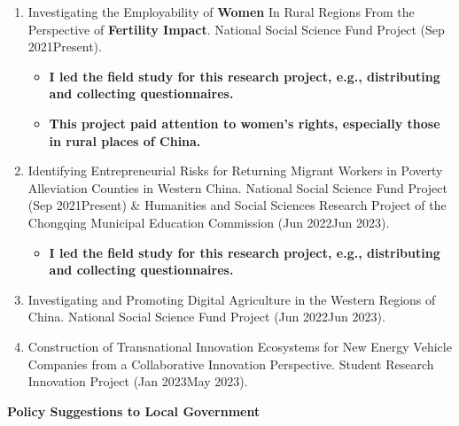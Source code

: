 \documentclass[a4paper,20pt]{article}
\begin{document}
    \begin{enumerate}
        \item Investigating the Employability of \textbf{Women} In Rural Regions From the Perspective of \textbf{Fertility Impact}.
        National Social Science Fund Project (Sep 2021\textemdash Present). 

            \begin{itemize}
     \vspace{-5pt}
	\item{\textbf{I led the field study for this research project, e.g., distributing and collecting questionnaires.}}
     \vspace{-5pt}
        \item{\textbf{This project paid attention to women's rights, especially those in rural places of China.}}
    \vspace{-5pt}
    \end{itemize}
        
        
        \item Identifying Entrepreneurial Risks for Returning Migrant Workers in Poverty Alleviation Counties in Western China.
        National Social Science Fund Project (Sep 2021\textemdash Present) \&  Humanities and Social Sciences Research Project of the Chongqing Municipal Education Commission (Jun 2022\textemdash Jun 2023). 
            \begin{itemize}
                 \vspace{-5pt}
	\item{\textbf{I led the field study for this research project, e.g., distributing and collecting questionnaires.}}
    \vspace{-5pt}
    \end{itemize}
        
        \item Investigating and Promoting Digital Agriculture in the Western Regions of China. National Social Science Fund Project (Jun 2022\textemdash Jun 2023).
        \item Construction of Transnational Innovation Ecosystems for New Energy Vehicle Companies from a Collaborative Innovation Perspective. 
        Student Research Innovation Project (Jan 2023\textemdash May 2023).
    \end{enumerate}

    \textbf{Policy Suggestions to Local Government}
\end{document}

